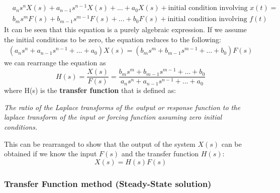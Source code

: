 \documentclass[12pt,letter]{article}
\numberwithin{ex}{section} %
\numberwithin{re}{section} %
\begin{document}
\begin{eqnarray}
&a_ns^nX(s) + a_{n-1}s^{n-1}X(s) + ... + a_0X(s) + \text{initial condition involving } x(t) =   \\
&b_ms^mF(s) + b_{m-1}s^{m-1}F(s) + ... + b_0F(s) + \text{initial condition involving } f(t)  \nonumber
\end{eqnarray}
It can be seen that this equation is a purely algebraic expression. If we assume the initial conditions to be zero, the equation reduces to the following:
\begin{eqnarray}
(a_ns^n + a_{n-1}s^{n-1} + ... + a_0)X(s) =  (b_ms^m + b_{m-1}s^{m-1} + ... + b_0)F(s) 
\end{eqnarray}
we can rearrange the equation as 
\begin{equation}
H(s) = \frac{X(s)}{F(s)} = \frac{b_ms^m + b_{m-1}s^{m-1} + ... + b_0}{a_ns^n + a_{n-1}s^{n-1} + ... + a_0}
\end{equation}
where H(s) is the \textbf{transfer function} that is defined as:

\textit{The ratio of the Laplace transforms of the output or response function to the laplace transform of the input or forcing function assuming zero initial conditions.}

This can be rearranged to show that the output of the system $X(s)$ can be obtained if we know the input $F(s)$ and the transfer function $H(s)$:
\begin{equation}
X(s) = H(s)F(s)
\end{equation}	


\subsubsection{Transfer Function method (Steady-State solution)}
\end{document}
